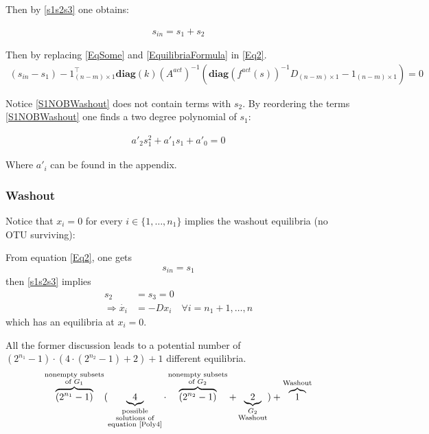 \documentclass[3p,times]{elsarticle}
\newcommand{\diag}{\textbf{diag}}
\begin{document}
Then by \eqref{s1s2s3} one obtains:

\begin{align}
s_{in} = s_1 + s_2
\end{align}

Then by replacing  \eqref{EqSome} and \eqref{EquilibriaFormula} in \eqref{Eq2}.
\begin{align}
\label{S1NOBWashout}  (s_{in}-s_1)-1_{(n-m)\times 1}^\top
\diag(k)(A^{act})^{-1}(\diag(f^{act}(s))^{-1}D_{(n-m)\times 1} - 1_{(n-m)\times 1}) = 0 
\end{align}

Notice \eqref{S1NOBWashout} does not contain terms with $s_2$. By reordering the terms \eqref{S1NOBWashout} one finds a two degree polynomial of $s_1$:

\begin{align}
a'_2 s_1^2 + a'_1s_1 + a'_0 = 0
\end{align}

Where $a'_i$ can be found in the appendix.

\subsubsection{Washout}	
Notice that $x_i = 0$ for every $i \in \{1,\dots, n_1\}$ implies the washout equilibria (no OTU surviving):

From equation \eqref{Eq2}, one gets 
\begin{align*} s_{in} = s_1 \end{align*}
then \eqref{s1s2s3} implies \begin{align*}s_2 &= s_3 = 0 \\ \Rightarrow \dot{x_i} &= -Dx_i \quad \forall i = n_1+1, \dots, n\end{align*}   
which has an equilibria at $x_i = 0$. 

All the former discussion leads to a potential number of   $ (2^{n_1}-1)\cdot (4\cdot(2^{n_2}-1)+2)+1 $  different equilibria. 
\begin{align} \overbrace{(2^{n_1}-1)}^{\substack{\text{nonempty subsets} \\ \text{of }G_1 }} (\underbrace{4}_{\substack{\text{possible} \\ \text{solutions of} \\ \text{equation \eqref{Poly4}}}} \cdot\overbrace{(2^{n_2}-1)}^{\substack{\text{nonempty subsets} \\ \text{of  }G_2}}+\underbrace{2}_{\substack{G_2 \\ \text{Washout}}})+\overbrace{1}^\text{Washout} 
\end{align}
\end{document}
